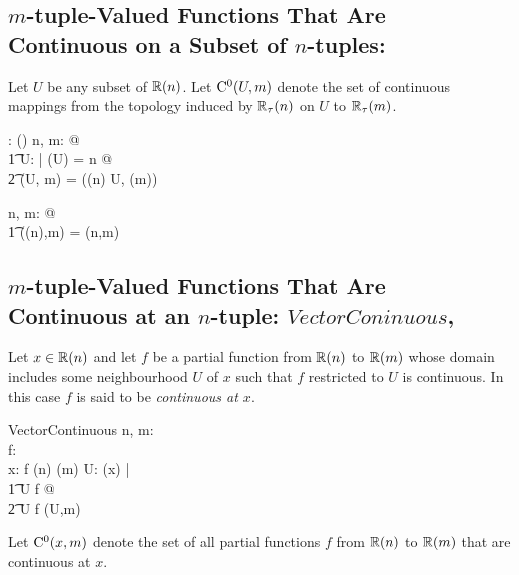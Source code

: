 \documentclass[11pt, oneside]{article}
\begin{document}
\subsection{$m$-tuple-Valued Functions That Are Continuous on a Subset of $n$-tuples: }

Let $U$ be any subset of $\operatorname{\mathbb{R}}(n)$.
Let $\operatorname{C^0}(U,m)$ denote the set of continuous mappings from the topology induced by $\mathbb{R}_\tau(n)$ on $U$ to $\mathbb{R}_\tau(m)$.

\begin{axdef}
	\CzeroSubsetRtupRtup: \DeltaRinf \cross \nat \fun \power (\Rinf \pfun \Rinf)
\where
	\forall n, m: \nat @ \\
	\t1	\forall U: \DeltaRinf | \dimRinf(U) = n @ \\
	\t2		\CzeroSubsetRtupRtup(U, m) = \CzeroTT(\tsRtup(n) \inducedTopSp U, \tsRtup(m))
\end{axdef}

\begin{remark}

\begin{zed}
	\forall n, m: \nat @ \\
	\t1	\CzeroSubsetRtupRtup(\Rtup(n),m) = \CzeroRtupRtup(n,m)
\end{zed}

\end{remark}

\subsection{$m$-tuple-Valued Functions That Are Continuous at an $n$-tuple: 
$VectorConinuous$, }

Let $x \in \operatorname{\mathbb{R}}(n)$ and let $f$ be a partial function from $\operatorname{\mathbb{R}}(n)$ to $\operatorname{\mathbb{R}}(m)$
whose domain includes some neighbourhood $U$ of $x$ such that $f$ restricted to $U$ is continuous.
In this case $f$ is said to be {\it continuous at $x$}.

\begin{schema}{VectorContinuous}
	n, m: \nat \\
	f: \Rinf \pfun \Rinf \\
	x: \Rinf
\where
	f \in \Rtup(n) \pfun \Rtup(m)
\also
	\exists U: \neighRinf(x) | \\
	\t1	U \subseteq \dom f @ \\
	\t2		U \dres f \in \CzeroSubsetRtupRtup(U,m)
\end{schema}

Let $\operatorname{C^0}(x,m)$ denote the set of all partial functions $f$ from $\operatorname{\mathbb{R}}(n)$ to $\operatorname{\mathbb{R}}(m)$
that are continuous at $x$.
\end{document}
